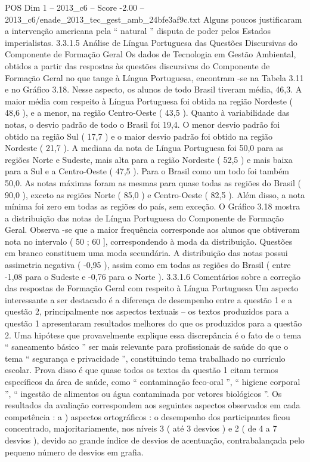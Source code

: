 \begin{textsample}{POS Dim 1 – 2013\_c6 – Score -2.00 – 2013\_c6/enade\_2013\_tec\_gest\_amb\_24bfe3af9c.txt}
Alguns poucos justificaram a intervenção americana pela “ natural ” disputa de poder pelos Estados imperialistas. 3.3.1.5 Análise de Língua Portuguesa das Questões Discursivas do Componente de Formação Geral Os dados de Tecnologia em Gestão Ambiental, obtidos a partir das respostas às questões discursivas do Componente de Formação Geral no que tange à Língua Portuguesa, encontram -se na Tabela 3.11 e no Gráfico 3.18.
Nesse aspecto, os alunos de todo Brasil tiveram média, 46,3.
A maior média com respeito à Língua Portuguesa foi obtida na região Nordeste ( 48,6 ), e a menor, na região Centro-Oeste ( 43,5 ).
Quanto à variabilidade das notas, o desvio padrão de todo o Brasil foi 19,4.
O menor desvio padrão foi obtido na região Sul ( 17,7 ) e o maior desvio padrão foi obtido na região Nordeste ( 21,7 ).
A mediana da nota de Língua Portuguesa foi 50,0 para as regiões Norte e Sudeste, mais alta para a região Nordeste ( 52,5 ) e mais baixa para a Sul e a Centro-Oeste ( 47,5 ).
Para o Brasil como um todo foi também 50,0.
As notas máximas foram as mesmas para quase todas as regiões do Brasil ( 90,0 ), exceto as regiões Norte ( 85,0 ) e Centro-Oeste ( 82,5 ).
Além disso, a nota mínima foi zero em todas as regiões do país, sem exceção.
O Gráfico 3.18 mostra a distribuição das notas de Língua Portuguesa do Componente de Formação Geral.
Observa -se que a maior frequência corresponde aos alunos que obtiveram nota no intervalo ( 50 ; 60 ], correspondendo à moda da distribuição.
Questões em branco constituem uma moda secundária.
A distribuição das notas possui assimetria negativa ( -0,95 ), assim como em todas as regiões do Brasil ( entre -1,08 para o Sudeste e -0,76 para o Norte ). 3.3.1.6 Comentários sobre a correção das respostas de Formação Geral com respeito à Língua Portuguesa Um aspecto interessante a ser destacado é a diferença de desempenho entre a questão 1 e a questão 2, principalmente nos aspectos textuais – os textos produzidos para a questão 1 apresentaram resultados melhores do que os produzidos para a questão 2.
Uma hipótese que provavelmente explique essa discrepância é o fato de o tema “ saneamento básico ” ser mais relevante para profissionais de saúde do que o tema “ segurança e privacidade ”, constituindo tema trabalhado no currículo escolar.
Prova disso é que quase todos os textos da questão 1 citam termos específicos da área de saúde, como “ contaminação feco-oral ”, “ higiene corporal ”, “ ingestão de alimentos ou água contaminada por vetores biológicos ”.
Os resultados da avaliação correspondem aos seguintes aspectos observados em cada competência : a ) aspectos ortográficos : o desempenho dos participantes ficou concentrado, majoritariamente, nos níveis 3 ( até 3 desvios ) e 2 ( de 4 a 7 desvios ), devido ao grande índice de desvios de acentuação, contrabalançada pelo pequeno número de desvios em grafia.

\end{textsample}
